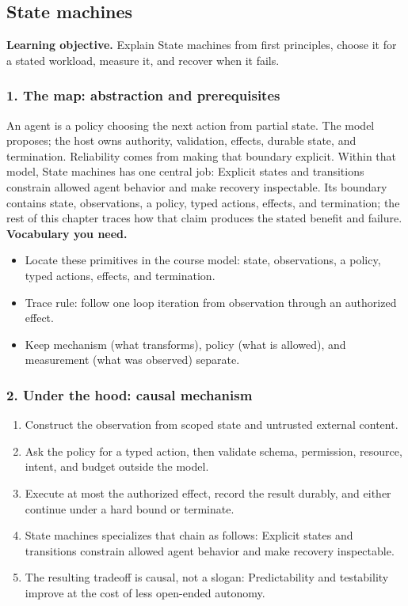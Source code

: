 \subsection{State machines}
\textbf{Learning objective.} Explain State machines from first principles, choose it for a stated workload, measure it, and recover when it fails.
\subsubsection*{1. The map: abstraction and prerequisites}
An agent is a policy choosing the next action from partial state. The model proposes; the host owns authority, validation, effects, durable state, and termination. Reliability comes from making that boundary explicit.
Within that model, State machines has one central job: Explicit states and transitions constrain allowed agent behavior and make recovery inspectable. Its boundary contains state, observations, a policy, typed actions, effects, and termination; the rest of this chapter traces how that claim produces the stated benefit and failure.
\textbf{Vocabulary you need.}\begin{itemize}
\item Locate these primitives in the course model: state, observations, a policy, typed actions, effects, and termination.
\item Trace rule: follow one loop iteration from observation through an authorized effect.
\item Keep mechanism (what transforms), policy (what is allowed), and measurement (what was observed) separate.
\end{itemize}
\subsubsection*{2. Under the hood: causal mechanism}\begin{enumerate}
\item Construct the observation from scoped state and untrusted external content.
\item Ask the policy for a typed action, then validate schema, permission, resource, intent, and budget outside the model.
\item Execute at most the authorized effect, record the result durably, and either continue under a hard bound or terminate.
\item State machines specializes that chain as follows: Explicit states and transitions constrain allowed agent behavior and make recovery inspectable.
\item The resulting tradeoff is causal, not a slogan: Predictability and testability improve at the cost of less open-ended autonomy.
\end{enumerate}
